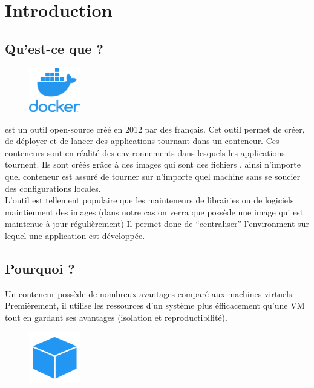 \section[Introduction]{Introduction}

\subsection[Qu'est-ce que Docker?]{Qu'est-ce que \docker{}?}
    
    \begin{figure}
        \centering
        \includegraphics[width=0.2\textwidth]{Images_formation/LogoDocker.pdf}
    \end{figure}

    \docker{} est un outil open-source créé en 2012 par des français. Cet outil permet de créer, de déployer et de lancer des applications tournant dans un conteneur. Ces conteneurs sont en réalité des environnements dans lesquels les applications tournent.
    Ils sont créés grâce à des images qui sont des fichiers \docker{}, ainsi n'importe quel conteneur est assuré de tourner sur n'importe quel machine sans se soucier des configurations locales.\\
    L'outil est tellement populaire que les mainteneurs de librairies ou de logiciels maintiennent des images \docker{} (dans notre cas on verra que \laravelsail{} possède une image \docker{} qui est maintenue à jour régulièrement)
    Il permet donc de ``centraliser'' l'environment sur lequel une application est développée. 


    
\subsection[Pourquoi Docker?]{Pourquoi \docker{}?}

    Un conteneur \docker{} possède de nombreux avantages comparé aux machines virtuels. Premièrement, il utilise les ressources d'un système plus éfficacement qu'une VM tout en gardant ses avantages (isolation et reproductibilité). 

    \begin{figure}
        \centering
        \includegraphics[width=0.2\textwidth]{Images_formation/Iconconteneur.pdf}
    \end{figure}

